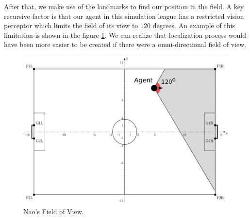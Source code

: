After that, we make use of the landmarks to find our position in the field. A key recursive factor is that 
our agent in this simulation league has a restricted vision perceptor which limits the field of its view to 120 degrees. An example of this limitation is shown in the figure \ref{fig:fieldofview}. We can realize that localization process would have been more easier to be created if there were a omni-directional field of view.
\begin{figure}[htb!]
\centering
  \includegraphics[scale=0.5]{Chapter3/figures/LViewAngle.pdf}
  \caption{Nao's Field of View.} 
  \label{fig:fieldofview}
\end{figure}
 
